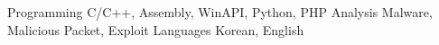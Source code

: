 \begin{cvskills}
  \cvskill
    {Programming}
    {C/C++, Assembly, WinAPI, Python, PHP}
  \cvskill
    {Analysis}
    {Malware, Malicious Packet, Exploit}
  \cvskill
    {Languages}
    {Korean, English}
\end{cvskills}
